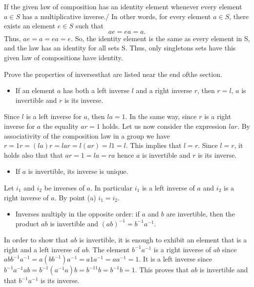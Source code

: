 \documentclass[
]{book}
\providecommand{\tightlist}{%
  \setlength{\itemsep}{0pt}\setlength{\parskip}{0pt}}
\begin{document}
If the given law of composition has an identity element whenever every
element \(a\in S\) has a multiplicative inverse./ In other words, for
every element \(a\in S\), there exists an element \(e \in S\) such that
\[ae = ea = a.\] Thus, \(ae=a=ea=e\). So, the identity element is the
same as every element in S, and the law has an identity for all sets S.
Thus, only singletons sets have this given law of compositions have
identity.

\leavevmode{}%
Prove the properties of inversesthat are listed near the end ofthe
section.

\begin{itemize}
\tightlist
\item
  If an element \(a\) has both a left inverse \(l\) and a right inverse
  \(r\), then \(r = l\), \(a\) is invertible and \(r\) is its inverse.
\end{itemize}

Since \(l\) is a left inverse for \(a\), then \(la = 1\). In the same
way, since \(r\) is a right inverse for \(a\) the equality \(ar = 1\)
holds. Let us now consider the expression \(lar\). By associativity of
the composition law in a group we have
\(r = 1r = (la)r = lar = l(ar) = l1 = l\). This implies that \(l = r\).
Since \(l = r\), it holds also that that \(ar = 1 = la = ra\) hence
\(a\) is invertible and \(r\) is its inverse.

\begin{itemize}
\tightlist
\item
  If \(a\) is invertible, its inverse is unique.
\end{itemize}

Let \(i_1\) and \(i_2\) be inverses of \(a\). In particular \(i_1\) is a
left inverse of \(a\) and \(i_2\) is a right inverse of \(a\). By point
(a) \(i_1 = i_2\).

\begin{itemize}
\tightlist
\item
  Inverses multiply in the opposite order: if \(a\) and \(b\) are
  invertible, then the product \(ab\) is invertible and
  \((ab)^{-1} = b^{-1}a^{-1}\).
\end{itemize}

In order to show that \(ab\) is invertible, it is enough to exhibit an
element that is a right and a left inverse of \(ab\). The element
\(b^{-1}a^{-1}\) is a right inverse of \(ab\) since
\(abb^{-1}a^{-1} = a(bb^{-1})a^{-1} = a1a^{-1} = aa^{-1} = 1\). It is a
left inverse since
\(b^{-1}a^{-1}ab = b^{-1}(a^{-1}a)b = b^{-11}b = b^{-1}b = 1\). This
proves that \(ab\) is invertible and that \(b^{-1}a^{-1}\) is its
inverse.
\end{document}
